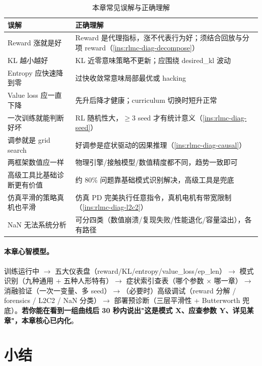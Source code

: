 \begin{table}[H]
\centering
\caption{本章常见误解与正确理解}
\label{tab:rlmc-diag-myths}
\begin{tabular}{p{5.4cm}p{7.0cm}}
\hline
误解 & 正确理解 \\
\hline
Reward 涨就是好 & Reward 是代理指标，涨不代表行为好；须结合回放与分项 reward（\cref{ins:rlmc-diag-decompose}） \\
KL 越小越好 & KL 近零意味策略不更新；应围绕 desired\_kl 波动 \\
Entropy 应快速降到零 & 过快收敛常意味局部最优或 hacking \\
Value loss 应一直下降 & 先升后降才健康；curriculum 切换时短升正常 \\
一次训练就能判断好坏 & RL 随机性大，$\ge 3$ seed 才有统计意义（\cref{ins:rlmc-diag-seed}） \\
调参就是 grid search & 好调参是症状驱动的因果推理（\cref{ins:rlmc-diag-causal}） \\
两框架数值应一样 & 物理引擎/接触模型/数值精度都不同，趋势一致即可 \\
高级工具比基础诊断更有价值 & 约 80\% 问题靠基础模式识别解决，高级工具是兜底 \\
仿真平滑的策略真机也平滑 & 仿真 PD 完美执行任意指令，真机电机有带宽限制（\cref{ins:rlmc-diag-l2c2}） \\
NaN 无法系统分析 & 可分四类（数值崩溃/复现失败/性能退化/容量溢出），各有路径 \\
\hline
\end{tabular}
\end{table}

\paragraph{本章心智模型。}训练运行中 $\to$ 五大仪表盘（reward/KL/entropy/value\_loss/ep\_len）$\to$ 模式识别（九种通用 + 五种人形特有）$\to$ 症状索引查表（哪个参数 $\times$ 哪一章）$\to$ 消融验证（一次一变量、多 seed）$\to$（必要时）高级调试（reward 分解 / forensics / L2C2 / NaN 分类）$\to$ 部署预诊断（三层平滑性 + Butterworth 兜底）。\textbf{若你能在看到一组曲线后 30 秒内说出"这是模式 X、应查参数 Y、详见某章"，本章核心已内化}。

\section*{小结}
\label{sec:rlmc-diag-summary}

